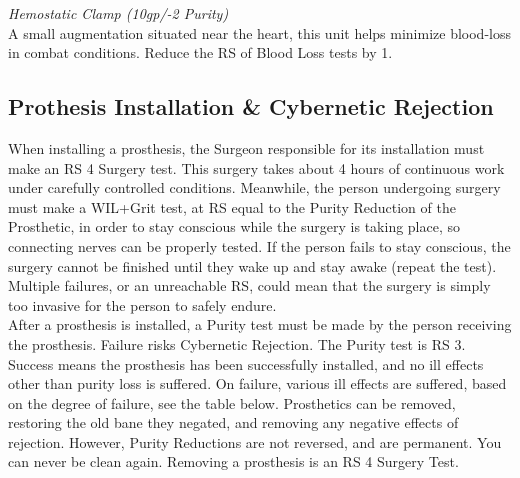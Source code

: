 \documentclass[a4paper, twocolumn, openany]{book}
\newlength{\indentlen}
\newcommand{\tabto}[1]{\setlength{\leftskip}{#1\indentlen}}
\begin{document}
{	{\slshape Hemostatic Clamp (10gp/-2 Purity)\\}
	A small augmentation situated near the heart, this unit helps minimize blood-loss in combat
	conditions. Reduce the RS of Blood Loss tests by 1.\\

\tabto{0}
\subsection{Prothesis Installation \& Cybernetic Rejection}
When installing a prosthesis, the Surgeon responsible for its installation must make an RS 4
Surgery test. This surgery takes about 4 hours of continuous work under carefully controlled
conditions. Meanwhile, the person undergoing surgery must make a WIL+Grit test, at RS equal
to the Purity Reduction of the Prosthetic, in order to stay conscious while the surgery is taking
place, so connecting nerves can be properly tested. If the person fails to stay conscious, the
surgery cannot be finished until they wake up and stay awake (repeat the test). Multiple failures,
or an unreachable RS, could mean that the surgery is simply too invasive for the person to
safely endure.\\

After a prosthesis is installed, a Purity test must be made by the person receiving the
prosthesis. Failure risks Cybernetic Rejection. The Purity test is RS 3. Success means the
prosthesis has been successfully installed, and no ill effects other than purity loss is suffered.
On failure, various ill effects are suffered, based on the degree of failure, see the table below.
Prosthetics can be removed, restoring the old bane they negated, and removing any negative
effects of rejection. However, Purity Reductions are not reversed, and are permanent. You can
never be clean again. Removing a prosthesis is an RS 4 Surgery Test.\\

}
\end{document}
